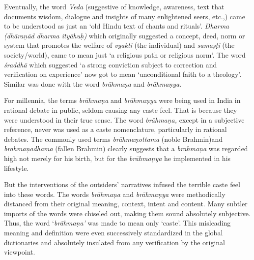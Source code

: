 Eventually, the word \textit{Veda} (suggestive of knowledge, awareness, text that documents wisdom, dialogue and insights of many enlightened seers, etc.,) came to be understood as just an ‘old Hindu text of chants and rituals’. \textit{Dharma (dhāraṇād dharma ityāhuḥ)} which originally suggested a concept, deed, norm or system that promotes the welfare of \textit{vyakti} (the individual) and \textit{samaṣṭi} (the society/world), came to mean just ‘a religious path or religious norm’. The word \textit{śraddhā} which suggested ‘a strong conviction subject to correction and verification on experience’ now got to mean ‘unconditional faith to a theology’. Similar was done with the word \textit{brāhmaṇa} and \textit{brāhmaṇya}.

For millennia, the terms \textit{brāhmaṇa} and \textit{brāhmaṇya} were being used in India in rational debate in public, seldom causing any caste feel. That is because they were understood in their true sense. The word \textit{brāhmaṇa,} except in a subjective reference, never was used as a caste nomenclature, particularly in rational debates. The commonly used terms \textit{brāhmaṇottama} (noble Brahmin)and \textit{brāhmaṇādhama} (fallen Brahmin) clearly suggests that a \textit{brāhmaṇa} was regarded high not merely for his birth, but for the \textit{brāhmaṇya} he implemented in his lifestyle.

But the interventions of the outsiders’ narratives infused the terrible caste feel into these words. The words \textit{brāhmaṇa} and \textit{brāhmaṇya} were methodically distanced from their original meaning, context, intent and content. Many subtler imports of the words were chiseled out, making them sound absolutely subjective. Thus, the word ‘\textit{brāhmaṇa’} was made to mean only ‘caste’. This misleading meaning and definition were even successively standardized in the global dictionaries and absolutely insulated from any verification by the original viewpoint.

